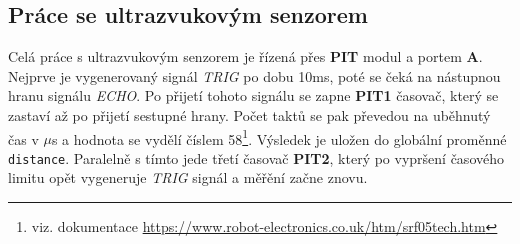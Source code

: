 \documentclass[a4paper,11pt]{article}
\begin{document}
    \subsection{Práce se ultrazvukovým senzorem}
    Celá práce s ultrazvukovým senzorem je řízená přes \textbf{PIT} modul a portem \textbf{A}. Nejprve je vygenerovaný signál \emph{TRIG} po dobu 10ms,
    poté se čeká na nástupnou hranu signálu \emph{ECHO}. Po přijetí tohoto signálu se zapne \textbf{PIT1} časovač, který se zastaví až po přijetí
    sestupné hrany. Počet taktů se pak převedou na uběhnutý čas v $\mu$s a hodnota se vydělí číslem 58\footnote{viz. dokumentace \url{https://www.robot-electronics.co.uk/htm/srf05tech.htm}}.
    Výsledek je uložen do globální proměnné \verb|distance|.
    Paralelně s tímto jede třetí časovač \textbf{PIT2}, který po vypršení časového limitu opět vygeneruje \emph{TRIG} signál a měřění začne znovu.
\end{document}
